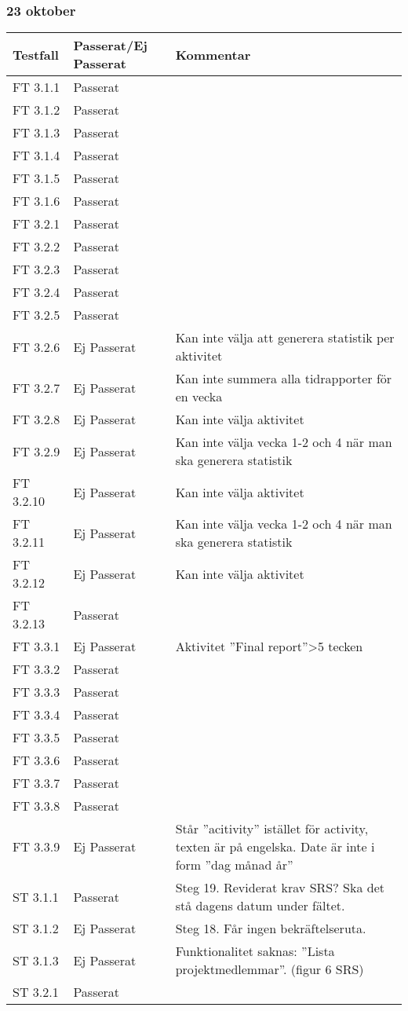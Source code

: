 \documentclass[a4paper]{article}
\begin{document}
\subsubsection{23 oktober}
\begin{tabular}{| l | l | p{9cm} |}
\hline
Testfall &  Passerat/Ej Passerat & Kommentar\\
\hline
FT 3.1.1 & Passerat & \\
\hline
FT 3.1.2 & Passerat & \\
\hline
FT 3.1.3 & Passerat & \\
\hline
FT 3.1.4 & Passerat & \\
\hline
FT 3.1.5 & Passerat & \\
\hline
FT 3.1.6 & Passerat & \\
\hline
FT 3.2.1 & Passerat & \\
\hline
FT 3.2.2 & Passerat & \\
\hline
FT 3.2.3 & Passerat & \\
\hline
FT 3.2.4 & Passerat & \\
\hline
FT 3.2.5 & Passerat & \\
\hline
FT 3.2.6 & Ej Passerat & Kan inte välja att generera statistik per aktivitet \\
\hline
FT 3.2.7 & Ej Passerat & Kan inte summera alla tidrapporter för en vecka \\
\hline
FT 3.2.8 & Ej Passerat &  Kan inte välja aktivitet \\
\hline
FT 3.2.9 & Ej Passerat &  Kan inte välja vecka 1-2 och 4 när man ska generera statistik\\
\hline
FT 3.2.10 & Ej Passerat & Kan inte välja aktivitet \\
\hline
FT 3.2.11 & Ej Passerat & Kan inte välja vecka 1-2 och 4 när man ska generera statistik \\
\hline
FT 3.2.12 & Ej Passerat & Kan inte välja aktivitet \\
\hline
FT 3.2.13 & Passerat & \\
\hline
FT 3.3.1 & Ej Passerat & Aktivitet ”Final report”>5 tecken \\
\hline
FT 3.3.2 & Passerat & \\
\hline
FT 3.3.3 & Passerat & \\
\hline
FT 3.3.4 & Passerat & \\
\hline
FT 3.3.5 & Passerat & \\
\hline
FT 3.3.6 & Passerat & \\
\hline
FT 3.3.7 & Passerat & \\
\hline
FT 3.3.8 & Passerat & \\
\hline
FT 3.3.9 & Ej Passerat & Står ”acitivity” istället för activity, texten är på engelska. Date är inte i form ”dag månad år” \\
\hline
ST 3.1.1 & Passerat &  Steg 19. Reviderat krav SRS? Ska det stå dagens datum under fältet.\\
\hline
ST 3.1.2 & Ej Passerat & Steg 18. Får ingen bekräftelseruta. \\
\hline
ST 3.1.3 & Ej Passerat & Funktionalitet saknas: ”Lista projektmedlemmar”. (figur 6 SRS) \\
\hline
ST 3.2.1 & Passerat & \\
\hline
\end{tabular}
\end{document}
